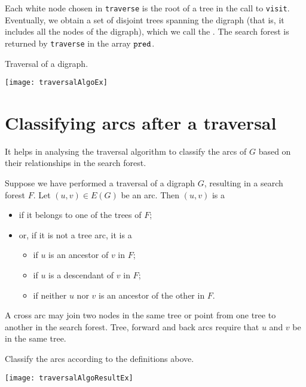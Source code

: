 Each white node chosen in \texttt{traverse} is the root of a tree in the call to \texttt{visit}. 
Eventually, we obtain a set of disjoint trees spanning the digraph (that is, it includes all the nodes of the digraph), 
which we call the . 
The search forest is returned by \texttt{traverse} in the array $\operatorname{\text{\texttt{pred}}}$.

\begin{Boxample}
Traversal of a digraph.
\begin{center}
  \texttt{[image: traversalAlgoEx]}
\end{center}
\end{Boxample}

\section{Classifying arcs after a traversal}
It helps in analysing the traversal algorithm to classify the arcs of $G$ based on their relationships in the search forest.  

\begin{Definition} \label{defn:arc-types}
Suppose we have performed a traversal of a digraph $G$, resulting in a search forest $F$. 
Let $(u, v)\in E(G)$ be an arc. Then $(u, v)$ is a
\begin{itemize} 
  \item {} if it belongs to one of the trees of $F$;
  \item or, if it is not a tree arc, it is a
  \begin{itemize}
	\item {} if $u$ is an ancestor of $v$ in $F$;
	\item {} if $u$ is a descendant of $v$ in $F$; 
	\item {} if neither $u$ nor $v$ is an ancestor of the other in $F$.
  \end{itemize}
\end{itemize}
\end{Definition} 

A cross arc may join two nodes in the same tree or point from one tree to another in the search forest. 
Tree, forward and back arcs require that $u$ and $v$ be in the same tree.

\begin{Boxample}
Classify the arcs according to the definitions above. 

\begin{center}
  \texttt{[image: traversalAlgoResultEx]} 
\end{center}
\end{Boxample}


